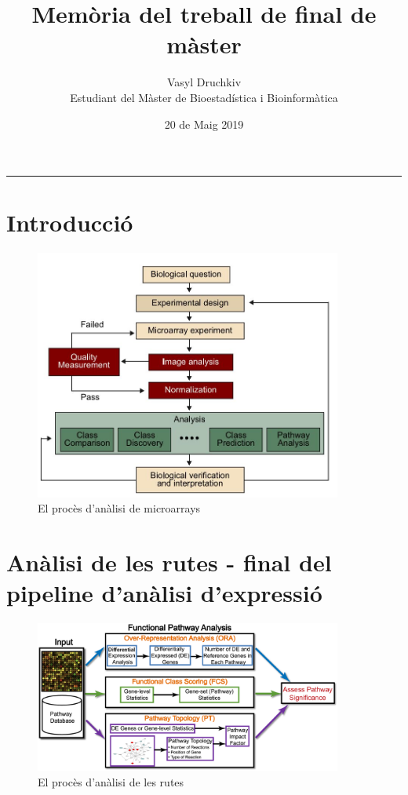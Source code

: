 \documentclass[]{article}
\title{Memòria del treball de final de màster}
\date{20 de Maig 2019}
\author{Vasyl Druchkiv \\ Estudiant del Màster de Bioestadística i Bioinformàtica}
\begin{document}
\maketitle
\makeatletter

\makeatother
\begin{spacing}{0.1}
\tableofcontents
\end{spacing}

\begin{center}
\noindent\rule{8cm}{0.4pt}
\end{center}

\section{Introducció}

\begin{figure}[H]
\centering
\includegraphics[width=0.9\textwidth]{Pipeline_Microarray.jpg} 
\caption{El procès d'anàlisi de microarrays}
\end{figure}


\section{Anàlisi de les rutes - final del pipeline d'anàlisi d'expressió}


\begin{figure}[H]
\centering
\includegraphics[width=0.9\textwidth]{Pipeline_Pathway.png} 
\caption{El procès d'anàlisi de les rutes}
\end{figure}
\end{document}
